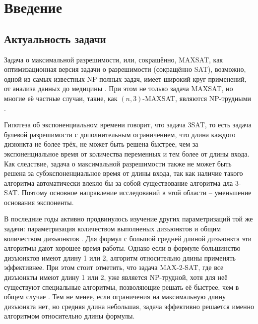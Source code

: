 
\section*{Введение}
\label{sec:intro}

\subsection*{Актуальность задачи}

\firstpar{}Задача о максимальной разрешимости, или, сокращённо, MAXSAT, как оптимизационная версия задачи о разрешимости (сокращённо SAT), возможно, одной из самых известных NP-полных задач, имеет широкий круг применений, от анализа данных \cite{berg2015applications} до медицины \cite{lin2012application}.
При этом не только задача MAXSAT, но многие её частные случаи, такие, как $(n,3)$-MAXSAT, являются NP-трудными \cite{raman1998simplified}.

Гипотеза об экспоненциальном времени говорит, что задача 3SAT, то есть задача булевой разрешимости с дополнительным ограничением, что длина каждого дизюнкта не более трёх, не может быть решена быстрее, чем за экспоненциальное время от количества переменных и тем более от длины входа. Как следствие, задача о максимальной разрешимости также не может быть решена за субэкспоненциальное время от длины входа, так как наличие такого алгоритма автоматически влекло бы за собой существование алгоритма дла 3-SAT. Поэтому основное направление исследований в этой области -- уменьшение основания экспоненты.

В последние годы активно продвинулось изучение других параметризаций той же задачи: параметризация количеством выполненых дизъюнктов \cite{chen15} и общим количеством дизъюнктов \cite{xu19}. Для формул с большой средней длиной дизъюнкта эти алгоритмы дают хорошее время работы. Однако если в формуле большинство дизъюнктов имеют длину 1 или 2, алгоритм относительно длины применять эффективнее. При этом стоит отметить, что задача MAX-2-SAT, где все дизъюнкты имеют длину 1 или 2, уже является NP-трудной, хотя для неё существуют специальные алгоритмы, позволяющие решать её быстрее, чем в общем случае \cite{golovnev2014new}. Тем не менее, если ограничения на максимальную длину дизъюнкта нет, но средняя длина небольшая, задача эффективно решается именно алгоритмом относительно длины формулы.

